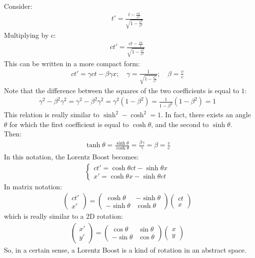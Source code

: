 \documentclass[../template.tex]{subfiles}
\begin{document}
Consider:
\begin{align*}
t' = \frac{t-\frac{v x}{c^2}}{\sqrt{1-\frac{v^2}{c^2}}}
\end{align*}
Multiplying by $c$:
\begin{align*}
ct' = \frac{ct-\frac{xv}{c}}{\sqrt{1-\frac{v^2}{c^2}}}
\end{align*}
This can be written in a more compact form:
\begin{align*}
ct' = \gamma ct - \beta\gamma x; \quad \gamma = \frac{1}{\sqrt{1-\frac{v^2}{c^2}}}; \quad \beta = \frac{v}{c}
\end{align*}
Note that the difference between the squares of the two coefficients is equal to $1$:
\begin{align*}
\gamma^2 - \beta^2\gamma^2 = \gamma^2-\beta^2\gamma^2 = \gamma^2(1-\beta^2) = \frac{1}{1-\beta^2}(1-\beta^2) = 1
\end{align*}
This relation is really similar to $\sinh^2-\cosh^2 = 1$. In fact, there exists an angle $\theta$ for which the first coefficient is equal to $\cosh \theta$, and the second to $\sinh \theta$. Then:
\begin{align*}
\tanh \theta = \frac{\sinh\theta}{\cosh\theta} = \frac{\beta\gamma}{\gamma} = \beta = \frac{v}{c}
\end{align*}
In this notation, the Lorentz Boost becomes:
\begin{align}
\label{eqn:boost-tanh}
\begin{cases}
ct' = \cosh\theta ct -\sinh\theta x\\
x' = \cosh\theta x - \sinh\theta ct
\end{cases}
\end{align}
In matrix notation:
\begin{align*}
\begin{pmatrix}ct'\\x'\end{pmatrix} =
\begin{pmatrix}\cosh\theta & -\sinh\theta\\
-\sinh\theta & \cosh\theta\end{pmatrix}\begin{pmatrix}
ct\\ x\end{pmatrix}
\end{align*}
which is really similar to a 2D rotation:
\begin{align*}
\begin{pmatrix}x'\\ y'\end{pmatrix} =
\begin{pmatrix}\cos\theta & \sin\theta\\
-\sin\theta & \cos\theta\end{pmatrix} \begin{pmatrix}x\\ y\end{pmatrix}
\end{align*}
So, in a certain sense, a Lorentz Boost is a kind of rotation in an abstract space.\\
\end{document}
